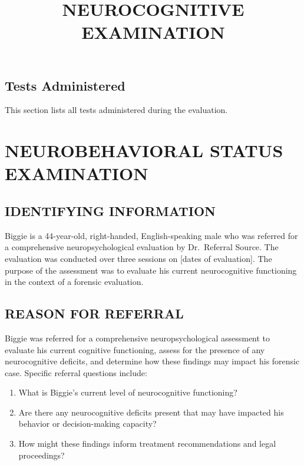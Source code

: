 \documentclass[
  letterpaper,
  DIV=11,
  numbers=noendperiod]{scrartcl}
\title{NEUROCOGNITIVE EXAMINATION}
\author{}
\date{}
\providecommand{\tightlist}{%
  \setlength{\itemsep}{0pt}\setlength{\parskip}{0pt}}
\begin{document}
\maketitle


\subsection{Tests Administered}\label{tests-administered}

This section lists all tests administered during the evaluation.

\section{NEUROBEHAVIORAL STATUS
EXAMINATION}\label{neurobehavioral-status-examination}

\subsection{IDENTIFYING INFORMATION}\label{identifying-information}

Biggie is a 44-year-old, right-handed, English-speaking male who was
referred for a comprehensive neuropsychological evaluation by
Dr.~Referral Source. The evaluation was conducted over three sessions on
{[}dates of evaluation{]}. The purpose of the assessment was to evaluate
his current neurocognitive functioning in the context of a forensic
evaluation.

\subsection{REASON FOR REFERRAL}\label{reason-for-referral}

Biggie was referred for a comprehensive neuropsychological assessment to
evaluate his current cognitive functioning, assess for the presence of
any neurocognitive deficits, and determine how these findings may impact
his forensic case. Specific referral questions include:

\begin{enumerate}
\def\labelenumi{\arabic{enumi}.}
\tightlist
\item
  What is Biggie's current level of neurocognitive functioning?
\item
  Are there any neurocognitive deficits present that may have impacted
  his behavior or decision-making capacity?
\item
  How might these findings inform treatment recommendations and legal
  proceedings?
\end{enumerate}
\end{document}
